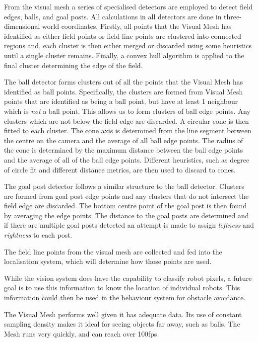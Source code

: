 \documentclass{llncs}
\begin{document}
From the visual mesh a series of specialised detectors are employed to detect field edges, balls, and goal posts. All calculations in all detectors are done in three-dimensional world coordinates. Firstly, all points that the Visual Mesh has identified as either field points or field line points are clustered into connected regions and, each cluster is then either merged or discarded using some heuristics until a single cluster remains. Finally, a convex hull algorithm is applied to the final cluster determining the edge of the field.

The ball detector forms clusters out of all the points that the Visual Mesh has identified as ball points. Specifically, the clusters are formed from Visual Mesh points that are identified as being a ball point, but have at least $1$ neighbour which is \emph{not} a ball point. This allows us to form clusters of ball edge points. Any clusters which are not below the field edge are discarded. A circular cone is then fitted to each cluster. The cone axis is determined from the line segment between the centre on the camera and the average of all ball edge points. The radius of the cone is determined by the maximum distance between the ball edge points and the average of all of the ball edge points. Different heuristics, such as degree of circle fit and different distance metrics, are then used to discard to cones.

The goal post detector follows a similar structure to the ball detector. Clusters are formed from goal post edge points and any clusters that do not intersect the field edge are discarded. The bottom centre point of the goal post is then found by averaging the edge points. The distance to the goal posts are determined and if there are multiple goal posts detected an attempt is made to assign \emph{leftness} and \emph{rightness} to each post.

The field line points from the visual mesh are collected and fed into the localisation system, which will determine how those points are used.

While the vision system does have the capability to classify robot pixels, a future goal is to use this information to know the location of individual robots. This information could then be used in the behaviour system for obstacle avoidance.

The Visual Mesh performs well given it has adequate data. Its use of constant sampling density makes it ideal for seeing objects far away, such as balls. The Mesh runs very quickly, and can reach over 100fps. 
\end{document}
